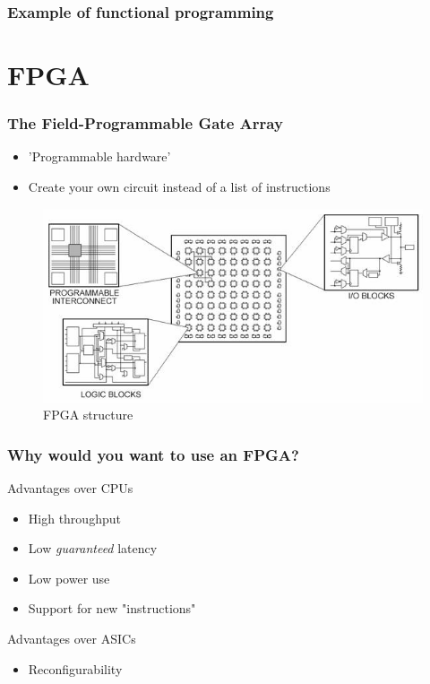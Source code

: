 \documentclass{beamer}[10]
\begin{document}
\begin{frame}[fragile]
	\frametitle{Example of functional programming}
	
\end{frame}	
	

\section{FPGA}
\begin{frame}
	\frametitle{The Field-Programmable Gate Array}
	\begin{itemize}
		\item 'Programmable hardware'
		\item Create your own circuit instead of a list of instructions
	\end{itemize}
	
	\begin{figure}
		\centering
		\includegraphics[width=\columnwidth]{figs/fpga.jpg}
		\caption{FPGA structure}
	\end{figure}
\end{frame}

\begin{frame}
	\frametitle{Why would you want to use an FPGA?}
	Advantages over CPUs
	\begin{itemize}
		\item High throughput
		\item Low \emph{guaranteed} latency
		\item Low power use
		\item Support for new "instructions"
	\end{itemize}
	\vspace{15pt}
	Advantages over ASICs
	\begin{itemize}
		\item Reconfigurability 
	\end{itemize}
\end{frame}
\end{document}
